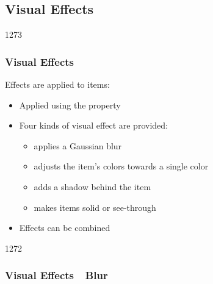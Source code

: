%
%
%
%

\subsection{Visual Effects}
\begin{slide}{1273}\frametitle{Visual Effects}

Effects are applied to items:

\begin{itemize}
\item Applied using the  property
\item Four kinds of visual effect are provided:
  \begin{itemize}
  \item {} applies a Gaussian blur
  \item {} adjusts the item's colors towards a single color
  \item {} adds a shadow behind the item
  \item {} makes items solid or see-through
  \end{itemize}
\item Effects can be combined
\end{itemize}

\end{slide}


\begin{slide}{1272}\frametitle{Visual Effects~\textendash~Blur}


\end{slide}


